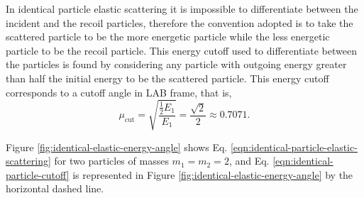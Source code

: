 In identical particle elastic scattering it is impossible to differentiate between the incident and the recoil particles, therefore the convention adopted is to take the scattered particle to be the more energetic particle while the less energetic particle to be the recoil particle. This energy cutoff used to differentiate between the particles is found by considering any particle with outgoing energy greater than half the initial energy to be the scattered particle. This energy cutoff corresponds to a cutoff angle in LAB frame, that is,
\begin{equation} \label{eqn:identical-particle-cutoff}
  \mu_{\text{cut}} = \sqrt{\dfrac{\frac{1}{2} E_1}{E_1}} = \dfrac{\sqrt{2}}{2} \approx 0.7071.
\end{equation}

Figure \ref{fig:identical-elastic-energy-angle} shows Eq. \eqref{eqn:identical-particle-elastic-scattering} for two particles of masses $m_{1} = m_{2} = 2$, and Eq. \eqref{eqn:identical-particle-cutoff} is represented in Figure \ref{fig:identical-elastic-energy-angle} by the horizontal dashed line.
